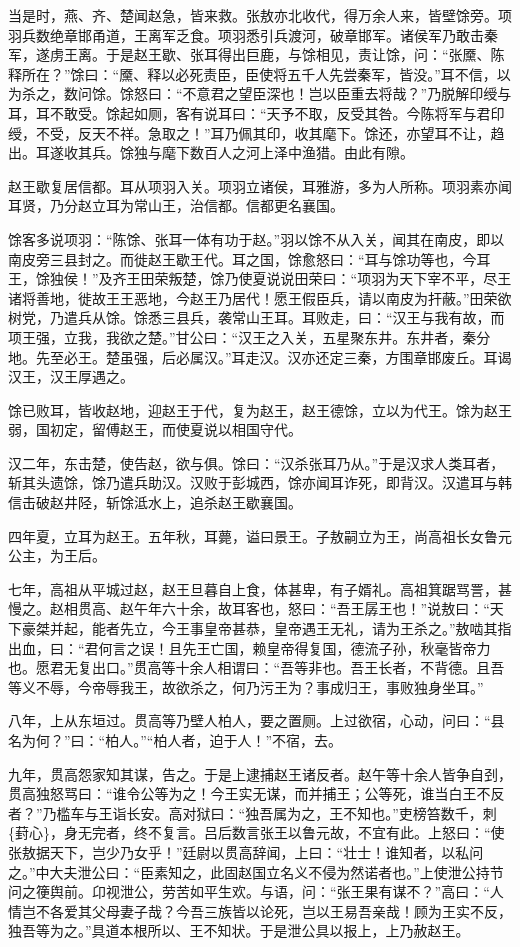 \documentclass[]{article}
\begin{document}
当是时，燕、齐、楚闻赵急，皆来救。张敖亦北收代，得万余人来，皆壁馀旁。项羽兵数绝章邯甬道，王离军乏食。项羽悉引兵渡河，破章邯军。诸侯军乃敢击秦军，遂虏王离。于是赵王歇、张耳得出巨鹿，与馀相见，责让馀，问：``张黡、陈释所在？''馀曰：``黡、释以必死责臣，臣使将五千人先尝秦军，皆没。''耳不信，以为杀之，数问馀。馀怒曰：``不意君之望臣深也！岂以臣重去将哉？''乃脱解印绶与耳，耳不敢受。馀起如厕，客有说耳曰：``天予不取，反受其咎。今陈将军与君印绶，不受，反天不祥。急取之！''耳乃佩其印，收其麾下。馀还，亦望耳不让，趋出。耳遂收其兵。馀独与麾下数百人之河上泽中渔猎。由此有隙。

赵王歇复居信都。耳从项羽入关。项羽立诸侯，耳雅游，多为人所称。项羽素亦闻耳贤，乃分赵立耳为常山王，治信都。信都更名襄国。

馀客多说项羽：``陈馀、张耳一体有功于赵。''羽以馀不从入关，闻其在南皮，即以南皮旁三县封之。而徙赵王歇王代。耳之国，馀愈怒曰：``耳与馀功等也，今耳王，馀独侯！''及齐王田荣叛楚，馀乃使夏说说田荣曰：``项羽为天下宰不平，尽王诸将善地，徙故王王恶地，今赵王乃居代！愿王假臣兵，请以南皮为扞蔽。''田荣欲树党，乃遣兵从馀。馀悉三县兵，袭常山王耳。耳败走，曰：``汉王与我有故，而项王强，立我，我欲之楚。''甘公曰：``汉王之入关，五星聚东井。东井者，秦分地。先至必王。楚虽强，后必属汉。''耳走汉。汉亦还定三秦，方围章邯废丘。耳谒汉王，汉王厚遇之。

馀已败耳，皆收赵地，迎赵王于代，复为赵王，赵王德馀，立以为代王。馀为赵王弱，国初定，留傅赵王，而使夏说以相国守代。

汉二年，东击楚，使告赵，欲与俱。馀曰：``汉杀张耳乃从。''于是汉求人类耳者，斩其头遗馀，馀乃遣兵助汉。汉败于彭城西，馀亦闻耳诈死，即背汉。汉遣耳与韩信击破赵井陉，斩馀泜水上，追杀赵王歇襄国。

四年夏，立耳为赵王。五年秋，耳薨，谥曰景王。子敖嗣立为王，尚高祖长女鲁元公主，为王后。

七年，高祖从平城过赵，赵王旦暮自上食，体甚卑，有子婿礼。高祖箕踞骂詈，甚慢之。赵相贯高、赵午年六十余，故耳客也，怒曰：``吾王孱王也！''说敖曰：``天下豪桀并起，能者先立，今王事皇帝甚恭，皇帝遇王无礼，请为王杀之。''敖啮其指出血，曰：``君何言之误！且先王亡国，赖皇帝得复国，德流子孙，秋毫皆帝力也。愿君无复出口。''贯高等十余人相谓曰：``吾等非也。吾王长者，不背德。且吾等义不辱，今帝辱我王，故欲杀之，何乃污王为？事成归王，事败独身坐耳。''

八年，上从东垣过。贯高等乃壁人柏人，要之置厕。上过欲宿，心动，问曰：``县名为何？''曰：``柏人。''``柏人者，迫于人！''不宿，去。

九年，贯高怨家知其谋，告之。于是上逮捕赵王诸反者。赵午等十余人皆争自刭，贯高独怒骂曰：``谁令公等为之！今王实无谋，而并捕王；公等死，谁当白王不反者？''乃槛车与王诣长安。高对狱曰：``独吾属为之，王不知也。''吏榜笞数千，刺\{葑心\}，身无完者，终不复言。吕后数言张王以鲁元故，不宜有此。上怒曰：``使张敖据天下，岂少乃女乎！''廷尉以贯高辞闻，上曰：``壮士！谁知者，以私问之。''中大夫泄公曰：``臣素知之，此固赵国立名义不侵为然诺者也。''上使泄公持节问之箯舆前。卬视泄公，劳苦如平生欢。与语，问：``张王果有谋不？''高曰：``人情岂不各爱其父母妻子哉？今吾三族皆以论死，岂以王易吾亲哉！顾为王实不反，独吾等为之。''具道本根所以、王不知状。于是泄公具以报上，上乃赦赵王。
\end{document}
